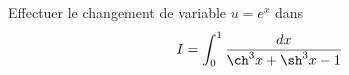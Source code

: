 Effectuer le changement de variable $u=e^{x}$ dans
\begin{displaymath}
 I=\int_0^{1}\frac{dx}{\ch^3 x + \sh^3 x -1}
\end{displaymath}
\bigskip